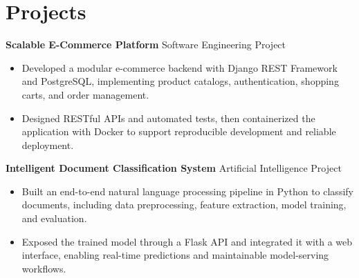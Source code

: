 \section*{Projects}

\textbf{Scalable E-Commerce Platform} \hfill Software Engineering Project
\begin{itemize}
    \item Developed a modular e-commerce backend with Django REST Framework and PostgreSQL, implementing product catalogs, authentication, shopping carts, and order management.
    \item Designed RESTful APIs and automated tests, then containerized the application with Docker to support reproducible development and reliable deployment.
\end{itemize}

\textbf{Intelligent Document Classification System} \hfill Artificial Intelligence Project
\begin{itemize}
    \item Built an end-to-end natural language processing pipeline in Python to classify documents, including data preprocessing, feature extraction, model training, and evaluation.
    \item Exposed the trained model through a Flask API and integrated it with a web interface, enabling real-time predictions and maintainable model-serving workflows.
\end{itemize}
